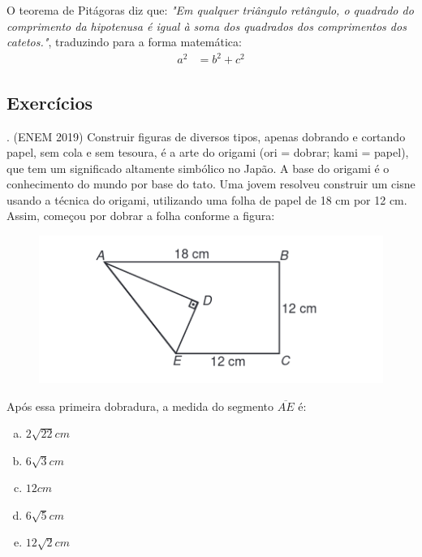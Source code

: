 \begin{multicols*}{2}
    O teorema de Pitágoras diz que: \textit{"Em qualquer triângulo retângulo, o quadrado do comprimento da hipotenusa é 
    igual à soma dos quadrados dos comprimentos dos catetos."}, traduzindo para 
    a forma matemática: 
    \begin{align}
        a^2 &= b^2 + c^2
    \end{align}



    \subsection{Exercícios}
    \newcommand\execnum{\thetest. }

    \noindent
    \execnum (ENEM 2019) Construir figuras de diversos tipos, apenas dobrando e cortando papel, 
    sem cola e sem tesoura, é a arte do origami (ori = dobrar; kami = papel), 
    que tem um significado altamente simbólico no Japão. A base do origami é o 
    conhecimento do mundo por base do tato. Uma jovem resolveu construir um
    cisne usando a técnica do origami, utilizando uma folha de papel de 18 cm 
    por 12 cm. Assim, começou por dobrar a folha conforme a figura:

    \begin{figure}[H]
        \includegraphics[width=\columnwidth]{assets/enem2019-171.png}
    \end{figure}

    \noindent 
    Após  essa  primeira  dobradura,  a  medida  do  segmento $\overline{AE}$ é:
    \begin{enumerate}[a)]
        \item $2\sqrt{22}cm$
        \item $6\sqrt{3}cm$
        \item $12cm$
        \item $6\sqrt{5}cm$
        \item $12\sqrt{2}cm$
    \end{enumerate}


\end{multicols*}

